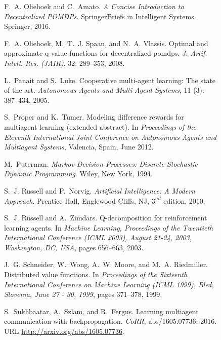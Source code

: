 \documentclass{article}
\begin{document}
\begin{SCfigure}
\begin{thebibliography}{40}
F.~A. Oliehoek and C.~Amato.
\newblock \emph{A Concise Introduction to Decentralized POMDPs}.
\newblock SpringerBriefs in Intelligent Systems. Springer, 2016.

F.~A. Oliehoek, M.~T.~J. Spaan, and N.~A. Vlassis.
\newblock Optimal and approximate q-value functions for decentralized pomdps.
\newblock \emph{J. Artif. Intell. Res. {(JAIR)}}, 32: 289--353, 2008.

L.~Panait and S.~Luke.
\newblock Cooperative multi-agent learning: The state of the art.
\newblock \emph{Autonomous Agents and Multi-Agent Systems}, 11
  (3): 387--434, 2005.

S.~Proper and K.~Tumer.
\newblock Modeling difference rewards for multiagent learning (extended
  abstract).
\newblock In \emph{Proceedings of the Eleventh International Joint Conference
  on Autonomous Agents and Multiagent Systems}, Valencia, Spain, June 2012.

M.~Puterman.
\newblock \emph{{Markov} Decision Processes: Discrete Stochastic Dynamic
  Programming}.
\newblock Wiley, New York, 1994.

S.~J. Russell and P.~Norvig.
\newblock \emph{Artificial Intelligence: A Modern Approach}.
\newblock Prentice Hall, Englewood Cliffs, NJ, $3^{nd}$ edition, 2010.

S.~J. Russell and A.~Zimdars.
\newblock Q-decomposition for reinforcement learning agents.
\newblock In \emph{Machine Learning, Proceedings of the Twentieth International
  Conference {(ICML} 2003), August 21-24, 2003, Washington, DC, {USA}}, pages
  656--663, 2003.

J.~G. Schneider, W.~Wong, A.~W. Moore, and M.~A. Riedmiller.
\newblock Distributed value functions.
\newblock In \emph{Proceedings of the Sixteenth International Conference on
  Machine Learning {(ICML} 1999), Bled, Slovenia, June 27 - 30, 1999}, pages
  371--378, 1999.

S.~Sukhbaatar, A.~Szlam, and R.~Fergus.
\newblock Learning multiagent communication with backpropagation.
\newblock \emph{CoRR}, abs/1605.07736, 2016.
\newblock URL \url{http://arxiv.org/abs/1605.07736}.


\end{thebibliography}
\end{SCfigure}
\end{document}
